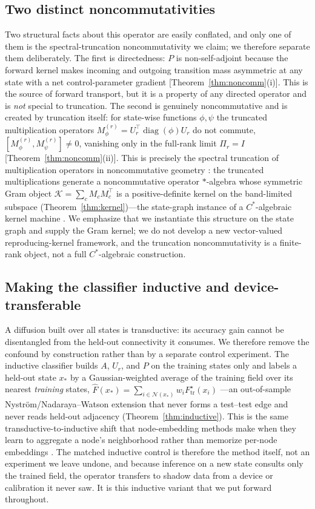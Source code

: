 \documentclass[aps,prresearch,reprint,amsmath,amssymb,nofootinbib,superscriptaddress,floatfix]{revtex4-2}
\theoremstyle{definition}
\theoremstyle{remark}
\theoremstyle{plain}
\begin{document}
\subsection{Two distinct noncommutativities}
Two structural facts about this operator are easily conflated, and only one of them is the
spectral-truncation noncommutativity we claim; we therefore separate them deliberately. The first is
directedness: $P$ is non-self-adjoint because the forward kernel makes incoming and outgoing transition
mass asymmetric at any state with a net control-parameter gradient [Theorem~\ref{thm:noncomm}(i)]. This is
the source of forward transport, but it is a property of any directed operator and is \emph{not} special to
truncation. The second is genuinely noncommutative and is created by truncation itself: for state-wise
functions $\phi,\psi$ the truncated multiplication operators
$M_\phi^{(r)}=U_r^\top\operatorname{diag}(\phi)U_r$ do not commute, $[M_\phi^{(r)},M_\psi^{(r)}]\neq0$,
vanishing only in the full-rank limit $\Pi_r=I$ [Theorem~\ref{thm:noncomm}(ii)]. This is precisely the
spectral truncation of multiplication operators in noncommutative geometry
\cite{vansuijlekom2021spectral,connes2021truncations}: the truncated multiplications generate a
noncommutative operator $*$-algebra whose symmetric Gram object $\mathcal K=\sum_c M_cM_c^\top$ is a
positive-definite kernel on the band-limited subspace (Theorem~\ref{thm:kernel})---the state-graph instance
of a $C^*$-algebraic kernel machine \cite{hashimoto2026spectral}. We emphasize that we instantiate this
structure on the state graph and supply the Gram kernel; we do not develop a new vector-valued
reproducing-kernel framework, and the truncation noncommutativity is a finite-rank object, not a full
$C^*$-algebraic construction.

\subsection{Making the classifier inductive and device-transferable}
A diffusion built over all states is transductive: its accuracy gain cannot be disentangled from the
held-out connectivity it consumes. We therefore remove the confound by construction rather than by a
separate control experiment. The inductive classifier builds $A$, $U_r$, and $P$ on the training states
only and labels a held-out state $x_\ast$ by a Gaussian-weighted average of the training field over its
nearest \emph{training} states, $\widehat F(x_\ast)=\sum_{i\in\mathcal N(x_\ast)}w_iF^\star_{\mathrm{tr}}(x_i)$%
---an out-of-sample Nystr\"om/Nadaraya--Watson extension \cite{williams2001nystrom,bengio2004oos} that never
forms a test--test edge and never reads held-out adjacency (Theorem~\ref{thm:inductive}). This is the same
transductive-to-inductive shift that node-embedding methods make when they learn to aggregate a node's
neighborhood rather than memorize per-node embeddings \cite{hamilton2017graphsage,velickovic2018gat}. The matched
inductive control is therefore the method itself, not an experiment we leave undone, and because inference
on a new state consults only the trained field, the operator transfers to shadow data from a device or
calibration it never saw. It is this inductive variant that we put forward throughout.
\end{document}
